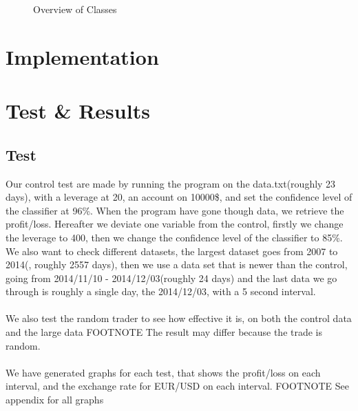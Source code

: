 \documentclass[10pt]{IEEEtran}
\begin{document}
\begin{figure}
\begin{center}
\end{center}
\caption{Overview of Classes}
\end{figure}




\section{Implementation}


\section{Test \& Results}
\subsection{Test}
Our control test are made by running the program on the data.txt(roughly 23 days), with a leverage at 20, an account on 10000\$, and set the confidence level of the classifier at 96\%. When the program have gone though data, we retrieve the profit/loss. Hereafter we deviate one variable from the control, firstly we change the leverage to 400, then we change the confidence level of the classifier to 85\%.\\
We also want to check different datasets, the largest dataset goes from 2007 to 2014(, roughly 2557 days), then we use a data set that is newer than the control, going from 2014/11/10 - 2014/12/03(roughly 24 days) and the last data we go through is roughly a single day, the 2014/12/03, with a 5 second interval.\\
\\
We also test the random trader to see how effective it is, on both the control data and the large data FOOTNOTE The result may differ because the trade is random.\\
\\
We have generated graphs for each test, that shows the profit/loss on each interval, and the exchange rate for EUR/USD on each interval. FOOTNOTE See appendix for all graphs
\end{document}
